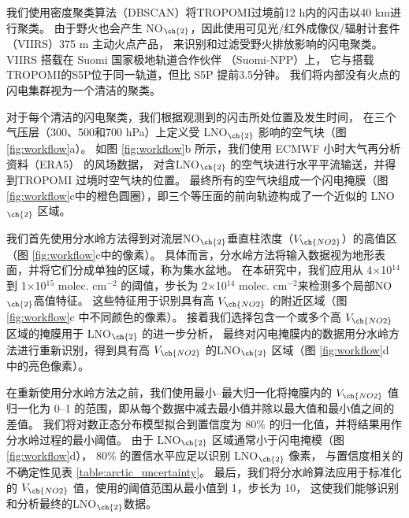 我们使用密度聚类算法（DBSCAN）将TROPOMI过境前12 h内\citep{Allen.2021a}的闪击以40 km进行聚类\citep{backlund2011density,Schubert.2017}。
由于野火也会产生 NO$_{\ch{2}}$，因此使用可见光/红外成像仪/辐射计套件（VIIRS）375 m 主动火点产品，
来识别和过滤受野火排放影响的闪电聚类。
VIIRS 搭载在 Suomi 国家极地轨道合作伙伴 （Suomi-NPP）上，
它与搭载TROPOMI的S5P位于同一轨道，但比 S5P 提前3.5分钟。
我们将内部没有火点的闪电集群视为一个清洁的聚类。

对于每个清洁的闪电聚类，我们根据观测到的闪击所处位置及发生时间，
在三个气压层（300、500和700 hPa）上定义受 LNO$_{\ch{2}}$ 影响的空气块（图 \ref{fig:workflow}a）。
如图 \ref{fig:workflow}b 所示，我们使用 ECMWF 小时大气再分析资料（ERA5） 的风场数据\citep{Hersbach.2020}，
对含LNO$_{\ch{2}}$ 的空气块进行水平平流输送，并得到TROPOMI 过境时空气块的位置。
最终所有的空气块组成一个闪电掩膜（图 \ref{fig:workflow}c中的橙色圆圈），即三个等压面的前向轨迹构成了一个近似的 LNO$_{\ch{2}}$ 区域。

我们首先使用分水岭方法得到对流层NO$_{\ch{2}}$垂直柱浓度（$V_{\ch{NO2}}$）的高值区（图 \ref{fig:workflow}c中的像素）。
具体而言，分水岭方法将输入数据视为地形表面，并将它们分成单独的区域，称为集水盆地\citep{Soille.1990,Heikenfeld.2019a}。
在本研究中，我们应用从 4$\times$10$^{14}$ 到 1$\times$10$^{15}$ molec. cm$^{-2}$ 的阈值，步长为 2$\times$10$^{14}$ molec. cm$^{-2}$来检测多个局部NO$_{\ch{2}}$高值特征。
这些特征用于识别具有高 $V_{\ch{NO2}}$ 的附近区域（图 \ref{fig:workflow}c 中不同颜色的像素）。
接着我们选择包含一个或多个高 $V_{\ch{NO2}}$ 区域的掩膜用于 LNO$_{\ch{2}}$ 的进一步分析，
最终对闪电掩膜内的数据用分水岭方法进行重新识别，得到具有高 $V_{\ch{NO2}}$ 的LNO$_{\ch{2}}$ 区域（图 \ref{fig:workflow}d 中的亮色像素）。

在重新使用分水岭方法之前，我们使用最小--最大归一化将掩膜内的 $V_{\ch{NO2}}$ 值归一化为 0--1 的范围，即从每个数据中减去最小值并除以最大值和最小值之间的差值。
我们将对数正态分布模型拟合到置信度为 80\% 的归一化值，并将结果用作分水岭过程的最小阈值。
由于 LNO$_{\ch{2}}$ 区域通常小于闪电掩模（图 \ref{fig:workflow}d），
80\% 的置信水平应足以识别 LNO$_{\ch{2}}$ 像素，
与置信度相关的不确定性见表 \ref{table:arctic_uncertainty}。
最后，我们将分水岭算法应用于标准化的 $V_{\ch{NO2}}$ 值，使用的阈值范围从最小值到 1，步长为 10，
这使我们能够识别和分析最终的LNO$_{\ch{2}}$数据。


